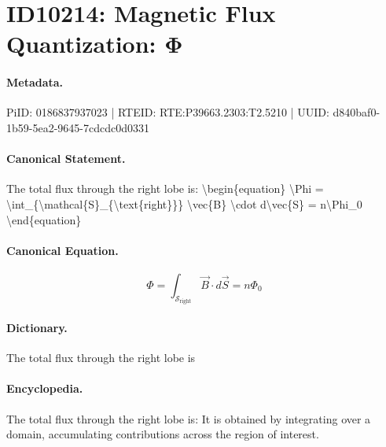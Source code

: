 \section*{ID10214: Magnetic Flux Quantization: Φ}
\paragraph{Metadata.}
PiID: 0186837937023 | RTEID: RTE:P39663.2303:T2.5210 | UUID: d840baf0-1b59-5ea2-9645-7cdcdc0d0331

\paragraph{Canonical Statement.}
The total flux through the right lobe is: \textbackslash{}begin\{equation\} \textbackslash{}Phi = \textbackslash{}int\_\{\textbackslash{}mathcal\{S\}\_\{\textbackslash{}text\{right\}\}\} \textbackslash{}vec\{B\} \textbackslash{}cdot d\textbackslash{}vec\{S\} = n\textbackslash{}Phi\_0 \textbackslash{}end\{equation\}

\paragraph{Canonical Equation.}
\[
\Phi = \int_{\mathcal{S}_{\text{right}}} \vec{B} \cdot d\vec{S} = n\Phi_0
\]

\paragraph{Dictionary.}
The total flux through the right lobe is

\paragraph{Encyclopedia.}
The total flux through the right lobe is: It is obtained by integrating over a domain, accumulating contributions across the region of interest.
